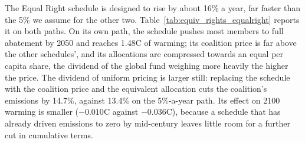 \documentclass[12pt,english]{article}
\theoremstyle{remark}
\begin{document}



The Equal Right schedule is designed to rise by about 16\% a year, far faster than the 5\% we assume for the other two. Table~\ref{tab:equiv_rights_equalright} reports it on both paths. On its own path, the schedule pushes most members to full abatement by 2050 and reaches 1.48\textdegree C of warming; its coalition price is far above the other schedules', and its allocations are compressed towards an equal per capita share, the dividend of the global fund weighing more heavily the higher the price. The dividend of uniform pricing is larger still: replacing the schedule with the coalition price and the equivalent allocation cuts the coalition's emissions by 14.7\%, against 13.4\% on the 5\%-a-year path. Its effect on 2100 warming is smaller ($-0.010$\textdegree C against $-0.036$\textdegree C), because a schedule that has already driven emissions to zero by mid-century leaves little room for a further cut in cumulative terms.
\end{document}
